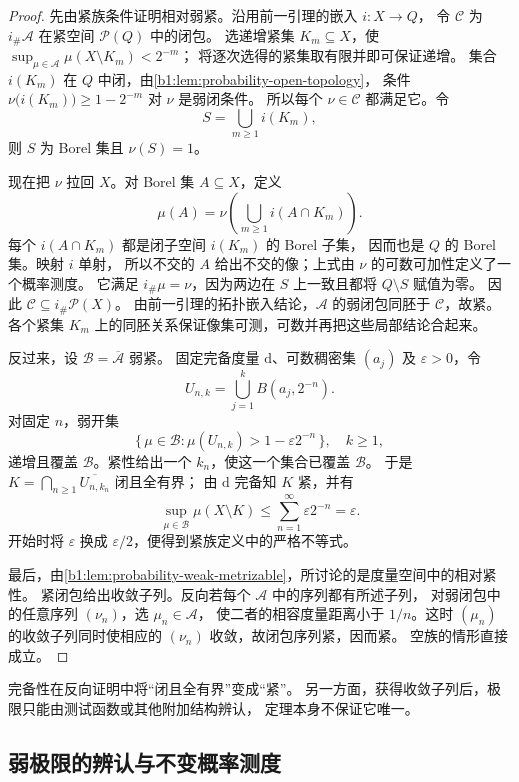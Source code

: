 \begin{proof}
先由紧族条件证明相对弱紧。沿用前一引理的嵌入 \(i:X\rightarrow Q\)，
令 \(\mathcal C\) 为 \(i_\#\mathcal A\) 在紧空间 \(\mathcal P(Q)\) 中的闭包。
选递增紧集 \(K_m\subseteq X\)，使
\(\sup_{\mu\in\mathcal A}\mu(X\setminus K_m)<2^{-m}\)；
将逐次选得的紧集取有限并即可保证递增。
集合 \(i(K_m)\) 在 \(Q\) 中闭，由\cref{b1:lem:probability-open-topology}，
条件 \(\nu\bigl(i(K_m)\bigr)\geq1-2^{-m}\) 对 \(\nu\) 是弱闭条件。
所以每个 \(\nu\in\mathcal C\) 都满足它。令
\[
 S=\bigcup_{m\geq1}i(K_m),
\]
则 \(S\) 为 Borel 集且 \(\nu(S)=1\)。

现在把 \(\nu\) 拉回 \(X\)。对 Borel 集 \(A\subseteq X\)，定义
\[
 \mu(A)=\nu\left(\bigcup_{m\geq1}i(A\cap K_m)\right).
\]
每个 \(i(A\cap K_m)\) 都是闭子空间 \(i(K_m)\) 的 Borel 子集，
因而也是 \(Q\) 的 Borel 集。映射 \(i\) 单射，
所以不交的 \(A\) 给出不交的像；上式由 \(\nu\) 的可数可加性定义了一个概率测度。
它满足 \(i_\#\mu=\nu\)，因为两边在 \(S\) 上一致且都将 \(Q\setminus S\) 赋值为零。
因此 \(\mathcal C\subseteq i_\#\mathcal P(X)\)。
由前一引理的拓扑嵌入结论，\(\mathcal A\) 的弱闭包同胚于 \(\mathcal C\)，故紧。
各个紧集 \(K_m\) 上的同胚关系保证像集可测，可数并再把这些局部结论合起来。

反过来，设 \(\mathcal B=\overline{\mathcal A}\) 弱紧。
固定完备度量 \(\mathrm{d}\)、可数稠密集 \((a_j)\) 及 \(\varepsilon>0\)，令
\[
 U_{n,k}=\bigcup_{j=1}^{k}B(a_j,2^{-n}).
\]
对固定 \(n\)，弱开集
\[
 \{\,\mu\in\mathcal B:\mu(U_{n,k})>1-\varepsilon2^{-n}\,\},
 \quad k\geq1,
\]
递增且覆盖 \(\mathcal B\)。紧性给出一个 \(k_n\)，使这一个集合已覆盖 \(\mathcal B\)。
于是 \(K=\bigcap_{n\geq1}\overline{U_{n,k_n}}\) 闭且全有界；
由 \(\mathrm{d}\) 完备知 \(K\) 紧，并有
\[
 \sup_{\mu\in\mathcal B}\mu(X\setminus K)
 \leq\sum_{n=1}^{\infty}\varepsilon2^{-n}=\varepsilon.
\]
开始时将 \(\varepsilon\) 换成 \(\varepsilon/2\)，便得到紧族定义中的严格不等式。

最后，由\cref{b1:lem:probability-weak-metrizable}，所讨论的是度量空间中的相对紧性。
紧闭包给出收敛子列。反向若每个 \(\mathcal A\) 中的序列都有所述子列，
对弱闭包中的任意序列 \((\nu_n)\)，选 \(\mu_n\in\mathcal A\)，
使二者的相容度量距离小于 \(1/n\)。这时
\((\mu_n)\) 的收敛子列同时使相应的 \((\nu_n)\) 收敛，故闭包序列紧，因而紧。
空族的情形直接成立。
\end{proof}

完备性在反向证明中将“闭且全有界”变成“紧”。
另一方面，获得收敛子列后，极限只能由测试函数或其他附加结构辨认，
定理本身不保证它唯一。

\subsection{弱极限的辨认与不变概率测度}
\label{b1:subsec:120403}

